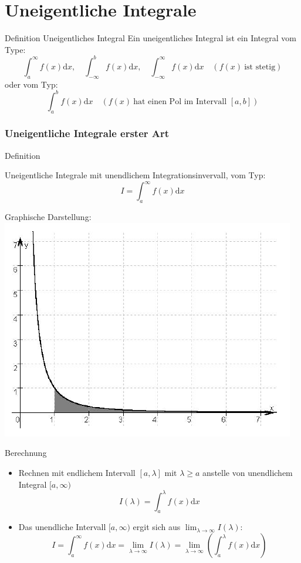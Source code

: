 \section{Uneigentliche Integrale}
\begin{definition}{Definition Uneigentliches Integral}
	Ein uneigentliches Integral ist ein Integral vom Type:
	\[\int_a^\infty{f(x)\mathrm{d}x}, \quad \int_{-\infty}^b{f(x)\mathrm{d}x}, \quad
	\int_{-\infty}^{\infty}{f(x)\mathrm{d}x} \quad (f(x) \: \text{ist stetig}) \]
	oder vom Typ:
	\[\int_a^b{f(x)\mathrm{d}x} \quad (f(x)\:\text{hat einen Pol im Intervall }[a,b]) \]
\end{definition}
\subsubsection{Uneigentliche Integrale erster Art}
\begin{definition}{Definition}\\
	\begin{minipage}{0.5\linewidth}
		Uneigentliche Integrale mit unendlichem Integrationsinvervall, vom Typ:
	\[I=\int_a^{\infty}{f(x)\mathrm{d}x} \]
	\end{minipage}
	\begin{minipage}{0.5\linewidth}
		\begin{center}
			Graphische Darstellung:\\
			\includegraphics[width=0.6\linewidth]{images/Uneigentlicher_Integral_Beispiel1.png}
		\end{center}
	\end{minipage}
\end{definition}
\begin{KR}{Berechnung}
\begin{itemize}
	\item Rechnen mit endlichem Intervall \([a,\lambda] \text{ mit } \lambda \ge a \) anstelle von unendlichem
		Integral \([a,\infty) \)
		\[I(\lambda)=\int_a^{\lambda}{f(x)\mathrm{d}x} \]
	\item Das unendliche Intervall \([a,\infty) \) ergit sich aus \(\lim_{\lambda \rightarrow
		\infty}I(\lambda) \):
		\[I=\int_a^{\infty}{f(x)\mathrm{d}x}=\underset{\lambda \rightarrow \infty}{\lim}I(\lambda)=
		\underset{\lambda \rightarrow \infty}{\lim}\left(\int_a^{\lambda}{f(x)\mathrm{d}x}\right) \]
\end{itemize}
\end{KR}

